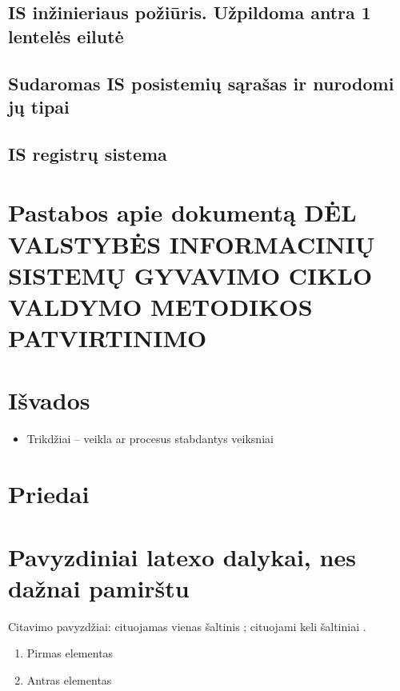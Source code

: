 \documentclass{VUMIFPSkursinis}
\begin{document}
\newpage
\subsection{IS inžinieriaus požiūris. Užpildoma antra 1 lentelės eilutė}

\newpage
\subsection{Sudaromas IS posistemių sąrašas ir nurodomi jų tipai}

\newpage
\subsection{IS registrų sistema}

\newpage
\section{Pastabos apie dokumentą DĖL VALSTYBĖS INFORMACINIŲ SISTEMŲ GYVAVIMO CIKLO VALDYMO METODIKOS PATVIRTINIMO}

\newpage

\section{Išvados}

\newpage
{}
\begin{itemize}
	\item{Trikdžiai -- veikla ar procesus stabdantys veiksniai}
\end{itemize}

\section{Priedai}

\newpage
\section{Pavyzdiniai latexo dalykai, nes dažnai pamirštu}
Citavimo pavyzdžiai: cituojamas vienas šaltinis \cite{PvzStraipsnLt}; cituojami
keli šaltiniai \cite{PvzStraipsnEn, PvzKonfLt, PvzKonfEn, PvzKnygLt, PvzKnygEn,
PvzElPubLt, PvzElPubEn, PvzMagistrLt, PvzPhdEn}.

\begin{enumerate}
	\item Pirmas elementas
	\item Antras elementas
\end{enumerate}
\end{document}
